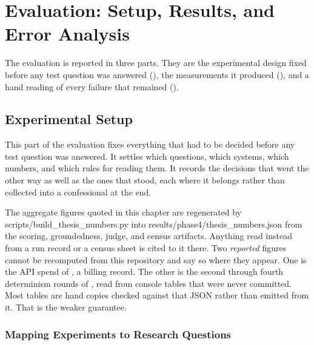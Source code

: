 \chapter{Evaluation: Setup, Results, and Error Analysis}\label{ch:evaluation}

The evaluation is reported in three parts. They are the experimental design
fixed before any test question was answered (), the measurements
it produced (), and a hand reading of every failure that
remained ().

\section{Experimental Setup}\label{sec:setup}

This part of the evaluation fixes everything that had to be decided before any
test question was answered. It settles which questions, which systems, which
numbers, and which rules for reading them. It records the decisions that went
the other way as well as the ones that stood, each where it belongs rather than
collected into a confessional at the end.

The aggregate figures quoted in this chapter are regenerated by
\textsf{scripts/\allowbreak build\_thesis\_numbers.py} into
\textsf{results/\allowbreak phase4/\allowbreak thesis\_numbers.json} from the
scoring, groundedness, judge, and census artifacts. Anything read instead from a
run record or a census sheet is cited to it there. Two \emph{reported} figures
cannot be recomputed from this repository and say so where they appear. One is
the API spend of , a billing record. The other is the second
through fourth determinism rounds of , read from console
tables that were never committed. Most tables are hand copies checked against
that JSON rather than emitted from it. That is the weaker guarantee.

\subsection{Mapping Experiments to Research Questions}\label{sec:experiment-map}

